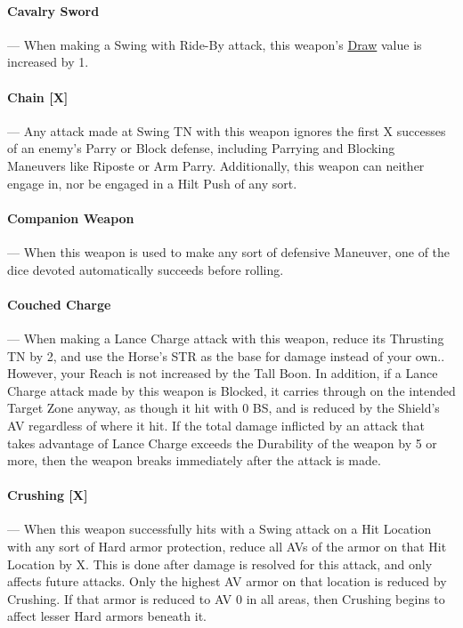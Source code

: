 \documentclass[oneside,11pt,english]{book}
\begin{document}
\paragraph{\label{wepqual:Cavalry Sword}Cavalry Sword}---\quad
When making a Swing with Ride-By attack, this weapon’s \hyperref[wepqual:Draw]{Draw} value is increased by 1.

\paragraph{\label{wepqual:Chain}Chain [X]}---\quad
Any attack made at Swing TN with this weapon ignores the first X successes of an enemy’s Parry or Block defense, including Parrying and Blocking Maneuvers like Riposte or Arm Parry. Additionally, this weapon can neither engage in, nor be engaged in a Hilt Push of any sort.

\paragraph{\label{wepqual:Companion Weapon}Companion Weapon}---\quad
When this weapon is used to make any sort of defensive Maneuver, one of the dice devoted automatically succeeds before rolling.

\paragraph{\label{wepqual:Couched Charge}Couched Charge}---\quad
When making a Lance Charge attack with this weapon, reduce its Thrusting TN by 2, and use the Horse’s STR as the base for damage instead of your own.. However, your Reach is not increased by the Tall Boon. In addition, if a Lance Charge attack made by this weapon is Blocked, it carries through on the intended Target Zone anyway, as though it hit with 0 BS, and is reduced by the Shield’s AV regardless of where it hit. If the total damage inflicted by an attack that takes advantage of Lance Charge exceeds the Durability of the weapon by 5 or more, then the weapon breaks immediately after the attack is made.

\paragraph{\label{wepqual:Crushing}Crushing [X]}---\quad
When this weapon successfully hits with a Swing attack on a Hit Location with any sort of Hard armor protection, reduce all AVs of the armor on that Hit Location by X. This is done after damage is resolved for this attack, and only affects future attacks. Only the highest AV armor on that location is reduced by Crushing. If that armor is reduced to AV 0 in all areas, then Crushing begins to affect lesser Hard armors beneath it. 
\end{document}
